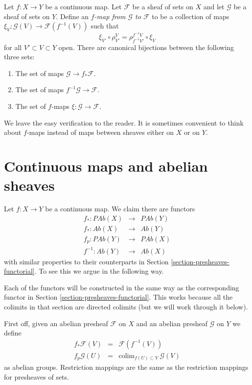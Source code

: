 \begin{remark}
\label{remark-f-map}
Let $f : X \to Y$ be a continuous map.
Let $\mathcal{F}$ be a sheaf of sets on $X$ and
let $\mathcal{G}$ be a sheaf of sets on $Y$.
Define an {\it $f$-map from $\mathcal{G}$
to $\mathcal{F}$} to be a collection of maps
$\xi_V : \mathcal{G}(V) \to \mathcal{F}(f^{-1}(V))$
such that
$$
\xi_{V'} \circ \rho_{V'}^V = \rho_{f^{-1}V'}^{f^{-1}V} \circ \xi_V
$$
for all $V' \subset V \subset Y$ open. There are
canonical bijections between the following three
sets:
\begin{enumerate}
\item The set of maps $\mathcal{G} \to f_*\mathcal{F}$.
\item The set of maps $f^{-1}\mathcal{G} \to \mathcal{F}$.
\item The set of $f$-maps $\xi : \mathcal{G} \to \mathcal{F}$.
\end{enumerate}
We leave the easy verification to the reader.
It is sometimes convenient to think about $f$-maps
instead of maps between sheaves either on $X$ or on $Y$.
\end{remark}



\section{Continuous maps and abelian sheaves}
\label{section-abelian-presheaves-functorial}

\noindent
Let $f : X \to Y$ be a continuous map.
We claim there are functors
\begin{eqnarray*}
f_* : \textit{PAb}(X) & \longrightarrow & \textit{PAb}(Y) \\
f_* : \textit{Ab}(X) & \longrightarrow & \textit{Ab}(Y) \\
f_p : \textit{PAb}(Y) & \longrightarrow & \textit{PAb}(X) \\
f^{-1} : \textit{Ab}(Y) & \longrightarrow & \textit{Ab}(X)
\end{eqnarray*}
with similar properties to their counterparts in 
Section \ref{section-presheaves-functorial}.
To see this we argue in the following way.

\medskip\noindent
Each of the functors will be constructed in the same
way as the corresponding functor in
Section \ref{section-presheaves-functorial}.
This works because all the colimits in that section
are directed colimits (but we will work through it below).

\medskip\noindent
First off, given an abelian presheaf $\mathcal{F}$ on $X$ and
an abelian presheaf $\mathcal{G}$ on $Y$ we define
\begin{eqnarray*}
f_*\mathcal{F}(V) & = & \mathcal{F}(f^{-1}(V)) \\
f_p\mathcal{G}(U) & = & \text{colim}_{f(U) \subset V}\ \mathcal{G}(V)
\end{eqnarray*}
as abelian groups. Restriction mappings are the same as 
the restriction mappings for presheaves of sets.

